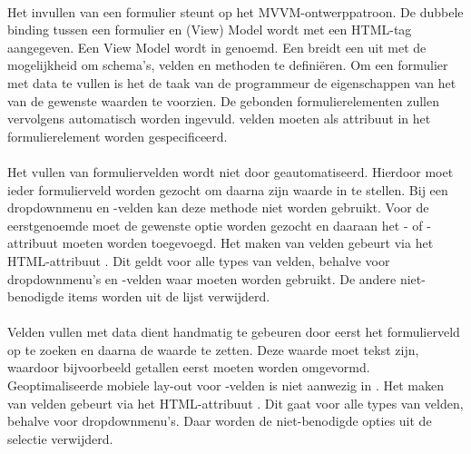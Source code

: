 \paragraph{\kendo}
Het invullen van een formulier steunt op het MVVM-ontwerppatroon.
De dubbele binding tussen een formulier en (View) Model wordt met een HTML-tag aangegeven.
Een View Model wordt in \kendo{}  genoemd.
Een  breidt een  uit met de mogelijkheid om schema's,  velden en methoden te definiëren.  
Om een formulier met data te vullen is het de taak van de programmeur de eigenschappen van het  van de gewenste waarden te voorzien.
De gebonden formulierelementen zullen vervolgens automatisch worden ingevuld.
 velden moeten als attribuut in het formulierelement worden gespecificeerd.

\paragraph{\jqm}
Het vullen van formuliervelden wordt niet door \jqm{} geautomatiseerd.
Hierdoor moet ieder formulierveld worden gezocht om daarna zijn waarde in te stellen.
Bij een dropdownmenu en -velden kan deze methode niet worden gebruikt.
Voor de eerstgenoemde moet de gewenste optie worden gezocht en daaraan het - of -attribuut moeten worden toegevoegd.
Het  maken van velden gebeurt via het HTML-attribuut .
Dit geldt voor alle types van velden, behalve voor dropdownmenu's en -velden waar  moeten worden gebruikt.
De andere niet-benodigde items worden uit de lijst verwijderd.

\paragraph{\lungo}
Velden vullen met data dient handmatig te gebeuren door eerst het formulierveld op te zoeken en daarna de waarde te zetten.
Deze waarde moet tekst zijn, waardoor bijvoorbeeld getallen eerst moeten worden omgevormd.
Geoptimaliseerde mobiele lay-out voor -velden is niet aanwezig in \lungo.
Het  maken van velden gebeurt via het HTML-attribuut .
Dit gaat voor alle types van velden, behalve voor dropdownmenu's.
Daar worden de niet-benodigde opties uit de selectie verwijderd.

